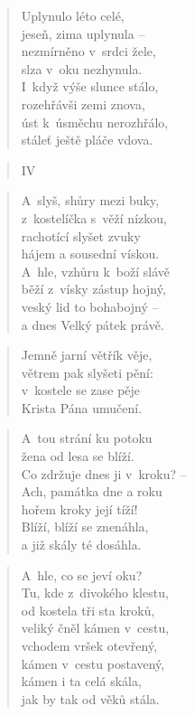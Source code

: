 \begin{verse}
Uplynulo léto celé, \\
jeseň, zima uplynula -- \\
nezmírněno v~srdci žele, \\
slza v~oku nezhynula. \\
I~když výše slunce stálo, \\
rozehřávši zemi znova, \\
úst k~úsměchu nerozhřálo, \\
stáleť ještě pláče vdova.
\end{verse}

\begin{verse}
IV
\end{verse}

\begin{verse}
A~slyš, shůry mezi buky, \\
z~kostelíčka s~věží nízkou, \\
rachotící slyšet zvuky \\
hájem a sousední vískou. \\
A~hle, vzhůru k~boží slávě \\
běží z~vísky zástup hojný, \\
veský lid to bohabojný -- \\
a dnes Velký pátek právě.
\end{verse}

\begin{verse}
Jemně jarní větřík věje, \\
větrem pak slyšeti pění: \\
v~kostele se zase pěje \\
Krista Pána umučení.
\end{verse}

\begin{verse}
A~tou strání ku potoku \\
žena od lesa se blíží. \\
Co zdržuje dnes ji v~kroku? -- \\
Ach, památka dne a roku \\
hořem kroky její tíží! \\
Blíží, blíží se znenáhla, \\
a již skály té dosáhla.
\end{verse}

\begin{verse}
A~hle, co se jeví oku? \\
Tu, kde z~divokého klestu, \\
od kostela tři sta kroků, \\
veliký čněl kámen v~cestu, \\
vchodem vršek otevřený, \\
kámen v~cestu postavený, \\
kámen i ta celá skála, \\
jak by tak od věků stála.
\end{verse}

